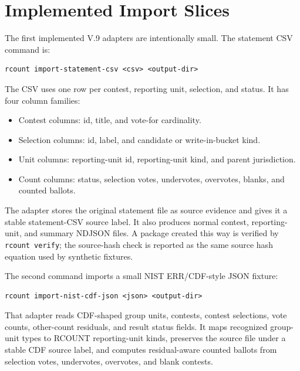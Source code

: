 \section{Implemented Import Slices}

The first implemented V.9 adapters are intentionally small. The statement CSV
command is:

\begin{verbatim}
rcount import-statement-csv <csv> <output-dir>
\end{verbatim}

The CSV uses one row per contest, reporting unit, selection, and status. It has
four column families:

\begin{itemize}
  \item Contest columns: id, title, and vote-for cardinality.
  \item Selection columns: id, label, and candidate or write-in-bucket kind.
  \item Unit columns: reporting-unit id, reporting-unit kind, and parent
    jurisdiction.
  \item Count columns: status, selection votes, undervotes, overvotes, blanks,
    and counted ballots.
\end{itemize}

The adapter stores the original statement file as source evidence and gives it a
stable statement-CSV source label. It also produces normal contest,
reporting-unit, and summary NDJSON files. A package created this way is verified
by \texttt{rcount verify}; the source-hash check is reported as the same source
hash equation used by synthetic fixtures.

The second command imports a small NIST ERR/CDF-style JSON fixture:

\begin{verbatim}
rcount import-nist-cdf-json <json> <output-dir>
\end{verbatim}

That adapter reads CDF-shaped group units, contests, contest selections, vote
counts, other-count residuals, and result status fields. It maps recognized
group-unit types to RCOUNT reporting-unit kinds, preserves the source file under
a stable CDF source label, and computes residual-aware counted ballots from
selection votes, undervotes, overvotes, and blank contests.
